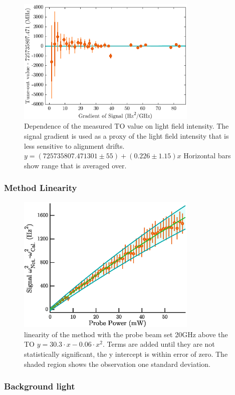 \documentclass[aps,prl,
,reprint,
superscriptaddress,
onecolumn,
showpacs,preprintnumbers,
 amsmath,amssymb,
]{revtex4-1}
\begin{document}
\begin{figure}[h!]
\centering
\includegraphics[width=8.6cm]{figs/grad_dep.eps}
\caption{ Dependence of the measured TO value on light field intensity. The signal gradient is used as a proxy of the light field intensity that is less sensitive to alignment drifts. $y=(725735807.471301\pm55)+(0.226\pm1.15)x$ Horizontal bars show range that is averaged over.
}
\end{figure}

\subsubsection{Method Linearity}

\begin{figure}[h!] 
\centering
\includegraphics[width=8.6cm]{figs/linearity.eps}
\caption{ 
linearity of the method with the probe beam set 20GHz above the TO $y=30.3\cdot x-0.06\cdot x^2$. Terms are added until they are not statistically significant, the y intercept is within error of zero. The shaded region shows the observation one standard deviation. }
\label{fig:to_lineaity}
\end{figure}

\subsubsection{Background light}
\end{document}
